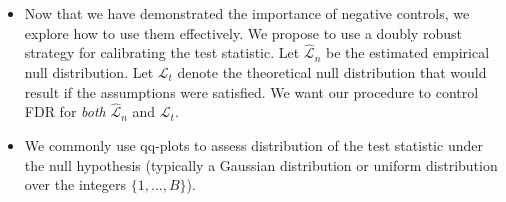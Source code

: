 \documentclass[12pt]{article}
\begin{document}
\begin{itemize}



\item Now that we have demonstrated the importance of negative controls, we explore how to use them effectively. We propose to use a doubly robust strategy for calibrating the test statistic. Let $\hat{\mathcal{L}}_n$ be the estimated empirical null distribution. Let $\mathcal{L}_t$ denote the theoretical null distribution that would result if the assumptions were satisfied. We want our procedure to control FDR for \textit{both} $\hat{\mathcal{L}}_n$ and $\mathcal{L}_t$.

\item We commonly use qq-plots to assess distribution of the test statistic under the null hypothesis (typically a Gaussian distribution or uniform distribution over the integers $\{1, \dots, B\}$). 

\end{itemize}



\end{document}
